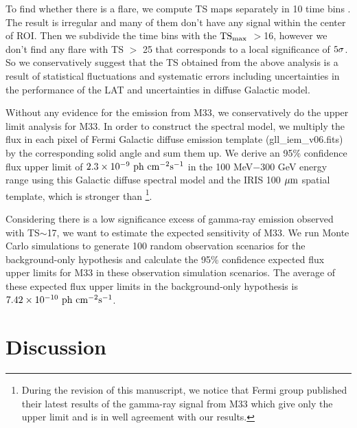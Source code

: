 \documentclass[useAMS,usenatbib,referee]{mn2e}
\begin{document}
To find whether there is a flare, we compute TS maps separately in 10 time bins . The result is irregular and many of them don't have any signal within the center of ROI. Then we subdivide the time bins with the ${\rm TS_{max}}$ $>$16, however we don't find any flare with TS $>$ 25 that corresponds to a local significance of $5{\rm \sigma}$. So we conservatively suggest that the TS obtained from the above analysis is a result of statistical fluctuations and systematic errors including uncertainties in the performance of the LAT and uncertainties in diffuse Galactic model.

Without any evidence for the emission from M33, we conservatively do the upper limit analysis for M33. In order to construct the spectral model, we multiply the flux in each pixel of Fermi Galactic diffuse emission template (gll\_iem\_v06.fits) by the corresponding solid angle and sum them up. We  derive an 95\% confidence flux upper limit of ${\rm 2.3\times10^{-9}~ph~cm^{-2} s^{-1}}$ in the 100 MeV$-$300 GeV energy range using this Galactic diffuse spectral model and the IRIS 100 ${\rm \mu m}$ spatial template, which is stronger than \citet{aaa+2010c}\footnote{During the revision of this manuscript, we notice that Fermi group published their latest results of the gamma-ray signal from M33 which give only the upper limit and is in well agreement with our results\citep{aaa+2017}.}.

Considering there is a low significance excess of gamma-ray emission observed with TS$\sim$17, we want to estimate the expected sensitivity of M33. We run Monte Carlo simulations to generate 100 random observation scenarios for the background-only hypothesis and calculate the 95\% confidence expected flux upper limits for M33 in these observation simulation scenarios. The average of these expected flux upper limits in the background-only hypothesis is ${\rm 7.42\times10^{-10}~ph~cm^{-2} s^{-1}}$.

\section{Discussion}
\end{document}
